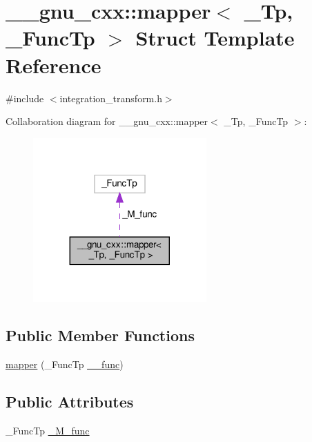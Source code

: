 \hypertarget{struct____gnu__cxx_1_1mapper}{}\section{\+\_\+\+\_\+gnu\+\_\+cxx\+:\+:mapper$<$ \+\_\+\+Tp, \+\_\+\+Func\+Tp $>$ Struct Template Reference}
\label{struct____gnu__cxx_1_1mapper}


{\ttfamily \#include $<$integration\+\_\+transform.\+h$>$}



Collaboration diagram for \+\_\+\+\_\+gnu\+\_\+cxx\+:\+:mapper$<$ \+\_\+\+Tp, \+\_\+\+Func\+Tp $>$\+:
\nopagebreak
\begin{figure}[H]
\begin{center}
\leavevmode
\includegraphics[width=188pt]{struct____gnu__cxx_1_1mapper__coll__graph}
\end{center}
\end{figure}
\subsection*{Public Member Functions}
\begin{DoxyCompactItemize}
\item 
\hyperlink{struct____gnu__cxx_1_1mapper_ae62b3c36179d502b8cf8ca670031d650}{mapper} (\+\_\+\+Func\+Tp \hyperlink{namespace____gnu__cxx_af2b2f0c7a2ae72b922b1afefae5a65b2}{\+\_\+\+\_\+func})
\end{DoxyCompactItemize}
\subsection*{Public Attributes}
\begin{DoxyCompactItemize}
\item 
\+\_\+\+Func\+Tp \hyperlink{struct____gnu__cxx_1_1mapper_a577a510fcb97643f3681a251a3a7acca}{\+\_\+\+M\+\_\+func}
\end{DoxyCompactItemize}


